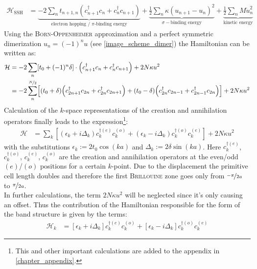 \begin{align}
	\mathcal{H}_\text{SSH} &= \underbrace{-2\sum_{n} t_{n+1,n}\left(c_{n+1}^\dagger c_n + c_n^\dagger c_{n+1}\right)}_{\text{electron hopping / $\pi$-binding energy}} +
	\underbrace{\frac{1}{2}\sum_n \kappa (u_{n+1} - u_n)^2}_{\sigma-\text{binding energy}} + 
	\underbrace{\frac{1}{2} \sum_n M \dot{u}^2_n}_{\text{kinetic energy}}
\end{align}
Using the \textsc{Born-Oppenheimer} approximation and a perfect symmetric dimerization $u_n = (-1)^nu$ (see \cref{image_scheme_dimer}) the Hamiltonian can be written as:
\begin{align}
	\mathcal{H} &= -2\sum_n \left[t_0 + (-1)^n\delta\right]\cdot\left(c_{n+1}^\dagger c_n + c_n^\dagger c_{n+1}\right) + 2N\kappa u^2\\
	&= -2\sum_n^{\nicefrac{N}{2}} \left[\left(t_0+\delta\right)\left(c_{2n+1}^\dagger c_{2n} + c_{2n}^\dagger c_{2n+1} \right) + 
	\left(t_0-\delta\right)\left(c_{2n}^\dagger c_{2n-1} + c_{2n-1}^\dagger c_{2n} \right)\right]+2N\kappa u^2
	\label{equation_SSH_hamiltonian_real_space}
\end{align}
Calculation of the $k$-space representations of the creation and annihilation operators finally leads to the expression\footnote{This and other important calculations are added to the appendix in \cref{chapter_appendix}.}:
\begin{align}
\mathcal{H} &= \sum_k \left[
\left(\epsilon_k + i\Delta_k\right)c_{k}^{\dagger(e)}c_{k}^{(o)} + \left(\epsilon_k-i\Delta_k \right)	c_{k}^{\dagger(o)}c_{k}^{(e)}\right] + 2N\kappa u^2
\end{align}
with the substitutions $\epsilon_k := 2t_0\cos(ka)$ and $\Delta_k := 2\delta\sin(ka)$. Here $c^{\dagger(e)}_k$, $c^{\dagger(o)}_k$, $c^{(e)}_k$, $c^{(o)}_k$ are the creation and annihilation operators at the even/odd $(e)$/$(o)$ positions for a certain $k$-point. Due to the displacement the primitive cell length doubles and therefore the first \textsc{Brillouine} zone goes only from $\nicefrac{-\pi}{2a}$ to $\nicefrac{\pi}{2a}$.\\
In further calculations, the term $2N\kappa u^2$ will be neglected since it's only causing an offset. Thus the contribution of the Hamiltonian responsible for the form of the band structure is given by the terms:
\begin{align}
	\mathcal{H}_k &=
	\left[\epsilon_k + i\Delta_k\right]c_{k}^{\dagger(e)}c_{k}^{(o)} + \left[\epsilon_k-i\Delta_k \right]	c_{k}^{\dagger(o)}c_{k}^{(e)}
\end{align}
